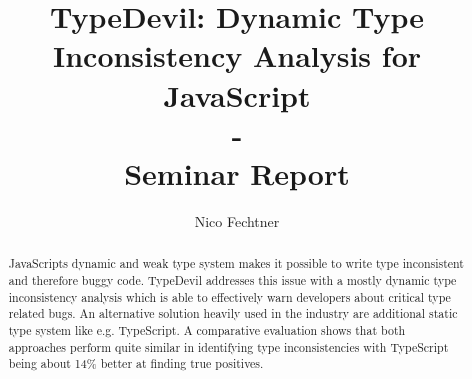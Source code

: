 \documentclass[runningheads,a4paper]{llncs}
\newcommand{\keywords}[1]{\par\addvspace\baselineskip

\noindent\keywordname\enspace\ignorespaces#1}
\begin{document}

\mainmatter  %

\title{TypeDevil: Dynamic Type Inconsistency Analysis for JavaScript\\-\\Seminar Report}


\author{Nico Fechtner}
%


%
%
\toctitle{}
\tocauthor{}
\maketitle
 \newpage
 \thispagestyle{empty}
\begin{abstract}
    JavaScripts dynamic and weak type system makes it possible to write type inconsistent and therefore buggy code. 
    TypeDevil addresses this issue with a mostly dynamic type inconsistency analysis which is able to effectively warn developers about critical type related bugs.
    An alternative solution heavily used in the industry are additional static type system like e.g. TypeScript.
    A comparative evaluation shows that both approaches perform quite similar in identifying type inconsistencies with TypeScript being about 14\% better at finding true positives.
    \end{abstract}
    
\end{document}
